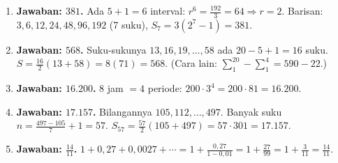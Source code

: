 \documentclass[a4paper,11pt]{article}
\newcommand{\dis}{\displaystyle}
\newcounter{no}
\begin{document}
\small\begin{enumerate}[leftmargin=2em,itemsep=2pt,topsep=2pt]
\item[\textbf{1.}] \textbf{Jawaban: $381$.} Ada $5+1=6$ interval: $r^{6}=\dis\frac{192}{3}=64\Rightarrow r=2$. Barisan: $3,6,12,24,48,96,192$ (7 suku), $S_7=3(2^{7}-1)=381$.
\item[\textbf{2.}] \textbf{Jawaban: $568$.} Suku-sukunya $13,16,19,\ldots,58$ ada $20-5+1=16$ suku. $S=\dis\frac{16}{2}(13+58)=8(71)=568$. (Cara lain: $\sum_{1}^{20}-\sum_{1}^{4}=590-22$.)
\item[\textbf{3.}] \textbf{Jawaban: $16.200$.} $8$ jam $=4$ periode: $200\cdot3^{4}=200\cdot81=16.200$.
\item[\textbf{4.}] \textbf{Jawaban: $17.157$.} Bilangannya $105,112,\ldots,497$. Banyak suku $n=\dis\frac{497-105}{7}+1=57$. $S_{57}=\dis\frac{57}{2}(105+497)=57\cdot301=17.157$.
\item[\textbf{5.}] \textbf{Jawaban: $\dis\frac{14}{11}$.} $1+0{,}27+0{,}0027+\cdots=1+\dis\frac{0{,}27}{1-0{,}01}=1+\dis\frac{27}{99}=1+\dis\frac{3}{11}=\dis\frac{14}{11}$.
\end{enumerate}
\par{}\par\vspace{0.2em}
\end{document}
